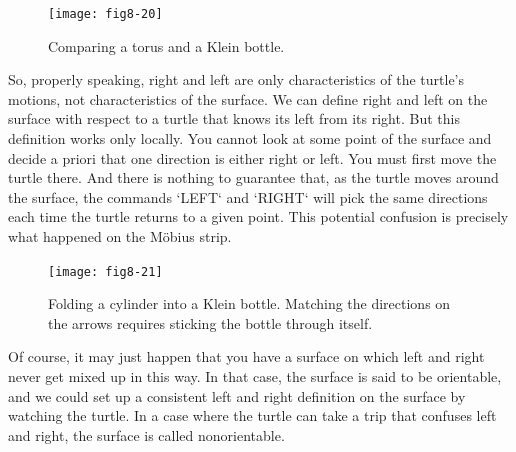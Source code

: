 \documentclass{book}
\begin{document}
\begin{figure}
\begin{center}
\texttt{[image: fig8-20]}
\caption{Comparing a torus and a Klein bottle.}
\end{center}
\end{figure}

So, properly speaking, right and left are only characteristics of the
turtle's motions, not characteristics of the surface. We can define right
and left on the surface with respect to a turtle that knows its left from
its right. But this definition works only locally. You cannot look at some
point of the surface and decide a priori that one direction is either right
or left. You must first move the turtle there. And there is nothing to
guarantee that, as the turtle moves around the surface, the commands
\textsc{`LEFT`} and \textsc{`RIGHT`} will pick the same directions each time the turtle returns
to a given point. This potential confusion is precisely what happened on
the M\"obius strip.

\begin{figure}
\begin{center}
\texttt{[image: fig8-21]}
\caption{Folding a cylinder into a Klein bottle. Matching the directions on the arrows requires sticking the bottle through itself.}
\end{center}
\end{figure}

Of course, it may just happen that you have a surface on which left
and right never get mixed up in this way. In that case, the surface is
said to be orientable, and we could set up a consistent left and right
definition on the surface by watching the turtle. In a case where the
turtle can take a trip that confuses left and right, the surface is called
nonorientable.
\end{document}
